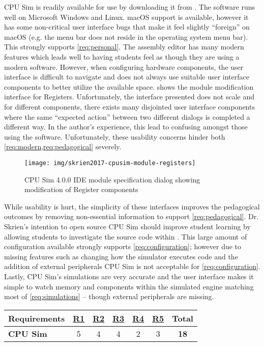 CPU Sim is readily available for use by downloading it from \cite{Skrien2017}. The software runs well on Microsoft Windows and Linux. macOS support is available, however it has some non-critical user interface bugs that make it feel slightly ``foreign'' on macOS (e.g. the menu bar does not reside in the operating system menu bar). This strongly supports \cref{req:personal}. The assembly editor has many modern features which leads well to having students feel as though they are using a modern software. However, when configuring hardware components, the user interface is difficult to navigate and does not always use suitable user interface components to better utilize the available space.  shows the module modification interface for Registers. Unfortunately, the interface presented does not scale and for different components, there exists many disjointed user interface components where the same ``expected action'' between two different dialogs is completed a different way. In the author's experience, this lead to confusing amongst those using the software. Unfortunately, these usability concerns hinder both \cref{req:modern,req:pedagogical} severely. 

\begin{figure}[bh!]
    \centering
    \texttt{[image: img/skrien2017-cpusim-module-registers]}
    \caption{CPU Sim 4.0.0 IDE module specification dialog showing modification of Register components \cite{Skrien2017}}
    \label{fig:skrien2017-cpusim-module-registers}
\end{figure}

While usability is hurt, the simplicity of these interfaces improves the pedagogical outcomes by removing non-essential information to support \cref{req:pedagogical}. Dr. Skrien's intention to open source CPU Sim should improve student learning by allowing students to investigate the source code within \cite{Skrien2016,Coppola2004,Koohang2005}. This large amount of configuration available strongly supports \cref{req:configuration}; however due to missing features such as changing how the simulator executes code and the addition of external peripherals CPU Sim is not acceptable for \cref{req:configuration}. Lastly, CPU Sim's simulations are very accurate and the user interface makes it simple to watch memory and components within the simulated engine matching most of \cref{req:simulations} -- though external peripherals are missing.

\begin{table}[h!]
    \centering
    \begin{tabular}{lcccccc}
        \textbf{Requirements} & \textbf{\hyperref[req:personal]{R1}} & \textbf{\hyperref[req:configuration]{R2}} & \textbf{\hyperref[req:pedagogical]{R3}} & \textbf{\hyperref[req:simulations]{R4}} & \textbf{\hyperref[req:modern]{R5}} & \textbf{Total} \\ \hline
        \textbf{CPU Sim \cite{Skrien2001, Skrien2001}}
        & 5 & 4 & 4 & 2 & 3 & \textbf{18} \\
    \end{tabular}
\end{table}

